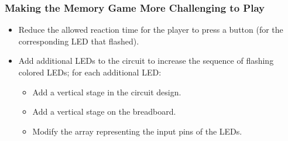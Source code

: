 \documentclass[xcolor={usenames,dvipsnames},hyperref={hyperindex,bookmarks}]{beamer}
\begin{document}
\frame
{
	\frametitle{Making the Memory Game More Challenging to Play}

	\begin{itemize}
	\item Reduce the allowed reaction time for the player to press a button (for the corresponding LED that flashed).
	\item Add additional LEDs to the circuit to increase the sequence of flashing colored LEDs; for each additional LED:
		\begin{itemize}
		\item Add a vertical stage in the circuit design.
		\item Add a vertical stage on the breadboard.
		\item Modify the array representing the input pins of the LEDs.
		\end{itemize}
	\end{itemize}
}








%
%
%
%
%	
%	
\end{document}

